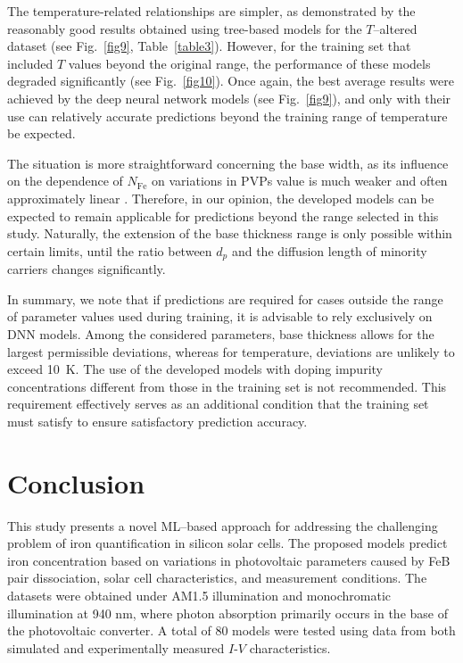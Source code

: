\documentclass[a4paper,fleqn]{cas-sc}
\begin{document}
The temperature-related relationships are simpler, as demonstrated by the reasonably good results
obtained using tree-based models for the $T$--altered dataset (see Fig.~\ref{fig9}, Table~\ref{table3}).
However, for the training set that included $T$ values beyond the original range,
the performance of these models degraded significantly (see Fig.~\ref{fig10}).
Once again, the best average results were achieved by the deep neural network models (see Fig.~\ref{fig9}),
and only with their use can relatively accurate predictions beyond the training range of temperature be expected.


The situation is more straightforward concerning the base width,
as its influence on the dependence of $N_\mathrm{Fe}$ on variations in PVPs value is much weaker and often approximately linear \cite{Olikh2025MSEB}.
Therefore, in our opinion, the developed models can be expected to remain applicable
for predictions beyond the range selected in this study.
Naturally, the extension of the base thickness range is only possible within certain limits,
until the ratio between $d_p$ and the diffusion length of minority carriers changes significantly.


In summary, we note that if predictions are required for cases outside the range of parameter values used during training,
it is advisable to rely exclusively on DNN models.
Among the considered parameters, base thickness allows for the largest permissible deviations,
whereas for temperature, deviations are unlikely to exceed 10~K.
The use of the developed models with doping impurity concentrations different
from those in the training set is not recommended.
This requirement effectively serves as an additional condition that the training set must satisfy
to ensure satisfactory prediction accuracy.


\section{Conclusion}

This study presents a novel ML--based approach for addressing the challenging problem of
iron quantification in silicon solar cells.
The proposed models predict iron concentration based on variations in photovoltaic parameters caused by FeB pair dissociation,
solar cell characteristics, and measurement conditions.
The datasets were obtained under AM1.5 illumination and monochromatic illumination at 940 nm,
where photon absorption primarily occurs in the base of the photovoltaic converter.
A total of 80 models were tested using data from both simulated and experimentally measured $I$-$V$ characteristics.
\end{document}
